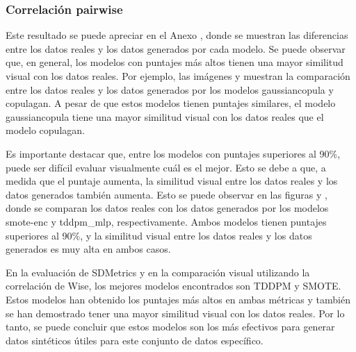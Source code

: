 \newpage
\subsubsection{Correlación pairwise}
Este resultado se puede apreciar en el Anexo , donde se muestran las diferencias entre los datos reales y los datos generados por cada modelo. Se puede observar que, en general, los modelos con puntajes más altos tienen una mayor similitud visual con los datos reales. Por ejemplo, las imágenes  y  muestran la comparación entre los datos reales y los datos generados por los modelos gaussiancopula y copulagan. A pesar de que estos modelos tienen puntajes similares, el modelo gaussiancopula tiene una mayor similitud visual con los datos reales que el modelo copulagan.





\newpage 
Es importante destacar que, entre los modelos con puntajes superiores al 90\%, puede ser difícil evaluar visualmente cuál es el mejor. Esto se debe a que, a medida que el puntaje aumenta, la similitud visual entre los datos reales y los datos generados también aumenta. Esto se puede observar en las figuras  y , donde se comparan los datos reales con los datos generados por los modelos smote-enc y tddpm\_mlp, respectivamente. Ambos modelos tienen puntajes superiores al 90\%, y la similitud visual entre los datos reales y los datos generados es muy alta en ambos casos.





En la evaluación de SDMetrics y en la comparación visual utilizando la correlación de Wise, los mejores modelos encontrados son TDDPM y SMOTE. Estos modelos han obtenido los puntajes más altos en ambas métricas y también se han demostrado tener una mayor similitud visual con los datos reales. Por lo tanto, se puede concluir que estos modelos son los más efectivos para generar datos sintéticos útiles para este conjunto de datos específico.


